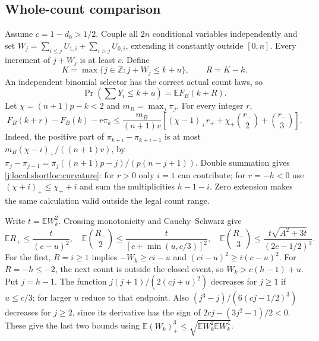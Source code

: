 \subsection{Whole-count comparison}

Assume $c=1-d_0>1/2$. Couple all $2n$ conditional variables independently and
set $W_j=\sum_{i\le j}U_{1,i}+\sum_{i>j}U_{0,i}$, extending it constantly
outside $[0,n]$. Every increment of $j+W_j$ is at least $c$. Define
\[
 K=\max\{j\in\mathbb Z:j+W_j\le k+u\},\qquad R=K-k.
\]
An independent binomial selector has the correct actual count laws, so
\begin{equation}\label{j:local:shortloc:cutoff}
                  \Pr(\textstyle\sum Y_i\le k+u)=\mathbb EF_B(k+R).
\end{equation}
Let $\chi=(n+1)p-k<2$ and $m_B=\max_j\pi_j$. For every integer $r$,
\begin{equation}\label{j:local:shortloc:curvature}
 F_B(k+r)-F_B(k)-r\pi_k\le\frac{m_B}{(n+1)v}
 \left[(\chi-1)_+r_++\chi_+\binom{r_-}{2}+\binom{r_-}{3}\right].
\end{equation}
Indeed, the positive part of $\pi_{k+i}-\pi_{k+i-1}$ is at most
$m_B(\chi-i)_+/((n+1)v)$, by
$\pi_j-\pi_{j-1}=\pi_j((n+1)p-j)/(p(n-j+1))$.
Double summation gives \eqref{j:local:shortloc:curvature}: for $r>0$ only $i=1$
can contribute; for $r=-h<0$ use $(\chi+i)_+\le\chi_++i$ and sum the
multiplicities $h-1-i$. Zero extension makes the same calculation valid
outside the legal count range.

Write $t=\mathbb EW_k^2$. Crossing monotonicity and Cauchy--Schwarz give
\begin{equation}\label{j:local:shortloc:crossingmoments}
 \mathbb ER_+\le\frac{t}{(c-u)^2},\quad
 \mathbb E\binom{R_-}{2}\le\frac{t}{[c+\min(u,c/3)]^2},\quad
 \mathbb E\binom{R_-}{3}\le\frac{t\sqrt{A^2+3t}}{(2c-1/2)^3}.
\end{equation}
For the first, $R=i\ge1$ implies $-W_k\ge ci-u$ and
$(ci-u)^2\ge i(c-u)^2$. For $R=-h\le-2$, the next count is outside the
closed event, so $W_k>c(h-1)+u$. Put $j=h-1$.
The function $j(j+1)/(2(cj+u)^2)$ decreases for $j\ge1$ if $u\le c/3$;
for larger $u$ reduce to that endpoint. Also
$(j^3-j)/(6(cj-1/2)^3)$ decreases for $j\ge2$, since its derivative has
the sign of $2cj-(3j^2-1)/2<0$. These give the last two bounds using
$\mathbb E(W_k)_+^3\le\sqrt{\mathbb EW_k^2\mathbb EW_k^4}$.

